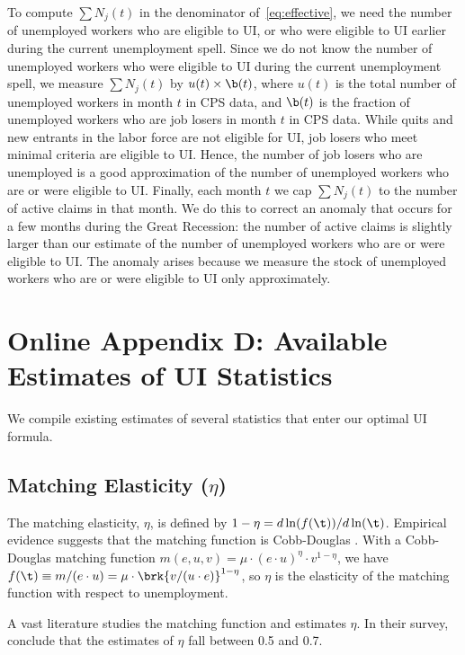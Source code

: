 \documentclass[letterpaper,12pt,leqno]{article}
\begin{document}
To compute $\sum  N_j(t)$ in the denominator of~\eqref{eq:effective}, we need the number of unemployed workers who are eligible to UI, or who were eligible to UI earlier during the current unemployment spell. Since we do not know the number of unemployed workers who were eligible to UI during the current unemployment spell, we measure $\sum N_j(t)$ by $u(t)\times \b(t)$, where $u(t)$ is the total number of unemployed workers in month $t$ in CPS data, and $\b(t)$ is the fraction of unemployed workers who are job losers in month $t$ in CPS data. While quits and new entrants in the labor force are not eligible for UI, job losers who meet minimal criteria are eligible to UI. Hence, the number of job losers who are unemployed is a good approximation of the number of unemployed workers who are or were eligible to UI. Finally, each month $t$ we cap $\sum N_j(t)$ to the number of active claims in that month. We do this to correct an anomaly that occurs for a few months during the Great Recession: the number of active claims is slightly larger than our estimate of the number of unemployed workers who are or were eligible to UI. The anomaly arises because we measure the stock of unemployed workers who are or were eligible to UI only approximately.

\section{Online Appendix D: Available Estimates of UI Statistics}\label{app:estimates}

We compile existing estimates of several statistics that enter our optimal UI formula.

\subsection{Matching Elasticity ($\eta$)}

The matching elasticity, $\eta$, is defined by $1-\eta=d\ln(f(\t))/d\ln(\t)$. Empirical evidence suggests that the matching function is Cobb-Douglas \citep[p.~424]{PP01}. With a Cobb-Douglas matching function $m(e,u,v)=\mu\cdot (e\cdot u)^{\eta}\cdot v^{1-\eta}$, we have $f(\t)\equiv m/(e\cdot u)=\mu\cdot \brk{v/(u\cdot e)}^{1-\eta}$, so $\eta$ is the elasticity of the matching function with respect to unemployment.

A vast literature studies the matching function and estimates $\eta$. In their survey, \citet[p.~424]{PP01} conclude that the estimates of $\eta$ fall between 0.5 and 0.7.
\end{document}
